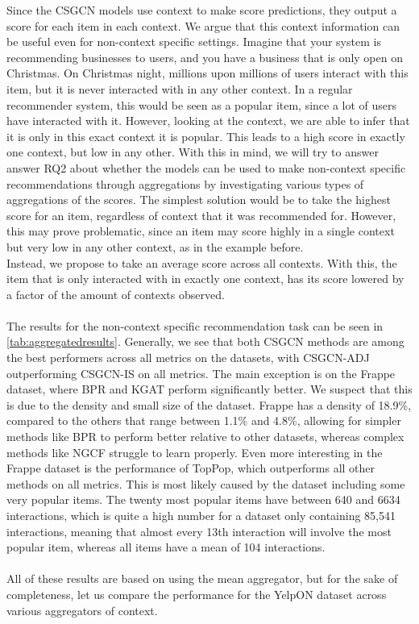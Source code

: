 Since the CSGCN models use context to make score predictions, they output a score for each item in each context.
We argue that this context information can be useful even for non-context specific settings.
Imagine that your system is recommending businesses to users, and you have a business that is only open on Christmas.
On Christmas night, millions upon millions of users interact with this item, but it is never interacted with in any other context.
In a regular recommender system, this would be seen as a popular item, since a lot of users have interacted with it.
However, looking at the context, we are able to infer that it is only in this exact context it is popular.
This leads to a high score in exactly one context, but low in any other.
With this in mind, we will try to answer answer RQ2 about whether the models can be used to make non-context specific recommendations through aggregations by investigating various types of aggregations of the scores.
The simplest solution would be to take the highest score for an item, regardless of context that it was recommended for.
However, this may prove problematic, since an item may score highly in a single context but very low in any other context, as in the example before.\\
Instead, we propose to take an average score across all contexts.
With this, the item that is only interacted with in exactly one context, has its score lowered by a factor of the amount of contexts observed.
\\\\
The results for the non-context specific recommendation task can be seen in \cref{tab:aggregatedresults}.
Generally, we see that both CSGCN methods are among the best performers across all metrics on the datasets, with CSGCN-ADJ outperforming CSGCN-IS on all metrics.
The main exception is on the Frappe dataset, where BPR and KGAT perform significantly better.
We suspect that this is due to the density and small size of the dataset.
Frappe has a density of 18.9\%, compared to the others that range between 1.1\% and 4.8\%, allowing for simpler methods like BPR to perform better relative to other datasets, whereas complex methods like NGCF struggle to learn properly.
Even more interesting in the Frappe dataset is the performance of TopPop, which outperforms all other methods on all metrics.
This is most likely caused by the dataset including some very popular items.
The twenty most popular items have between 640 and 6634 interactions, which is quite a high number for a dataset only containing 85,541 interactions, meaning that almost every 13th interaction will involve the most popular item, whereas all items have a mean of 104 interactions.\\\\
All of these results are based on using the mean aggregator, but for the sake of completeness, let us compare the performance for the YelpON dataset across various aggregators of context.

